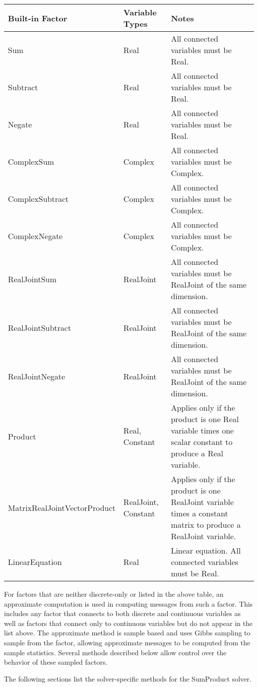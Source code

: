 \begin{longtable} {p{4.0cm} p{3.0cm} p{7.0cm}}
Built-in Factor & Variable Types &  Notes \\
\hline
\endhead
Sum & Real & All connected variables must be Real.  \\
Subtract & Real & All connected variables must be Real. \\
Negate & Real & All connected variables must be Real. \\
ComplexSum & Complex & All connected variables must be Complex. \\
ComplexSubtract & Complex & All connected variables must be Complex. \\
ComplexNegate & Complex & All connected variables must be Complex. \\
RealJointSum & RealJoint & All connected variables must be RealJoint of the same dimension. \\
RealJointSubtract & RealJoint & All connected variables must be RealJoint of the same dimension. \\
RealJointNegate & RealJoint & All connected variables must be RealJoint of the same dimension. \\
Product & Real, Constant & Applies only if the product is one Real variable times one scalar constant to produce a Real variable. \\
MatrixRealJoint\newline VectorProduct & RealJoint, \newline Constant & Applies only if the product is one RealJoint variable times a constant matrix to produce a RealJoint variable. \\
LinearEquation & Real & Linear equation.  All connected variables must be Real. \\
\end{longtable}

For factors that are neither discrete-only or listed in the above table, an approximate computation is used in computing messages from such a factor.  This includes any factor that connects to both discrete and continuous variables as well as factors that connect only to continuous variables but do not appear in the list above.  The approximate method is sample based and uses Gibbs sampling to sample from the factor, allowing approximate messages to be computed from the sample statistics.  Several methods described below allow control over the behavior of these sampled factors.

The following sections list the solver-specific methods for the SumProduct solver.

